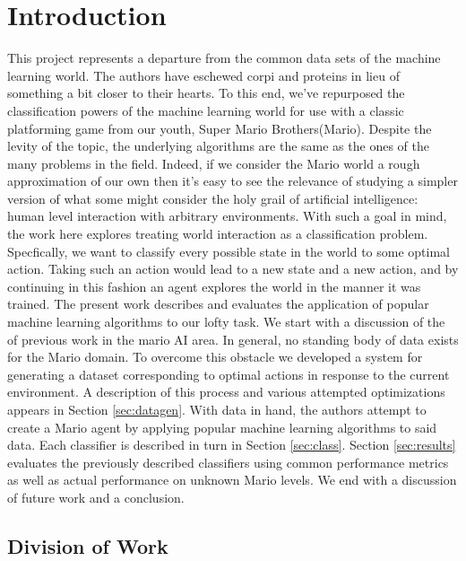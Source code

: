 \documentclass[]{article}   %
\begin{document}
\section{Introduction}     %
This project represents a departure from the common data sets of the machine learning world. The authors have eschewed corpi and proteins in lieu of something a bit closer to their hearts.  To this end, we've repurposed the classification powers of the machine learning world for use with a classic platforming game from our youth, Super Mario Brothers(Mario).  Despite the levity of the topic, the underlying algorithms are the same as the ones of the  many problems in the field.  Indeed, if we consider the Mario world a rough approximation of our own then it's easy to see the relevance of studying a simpler version of what some might consider the holy grail of artificial intelligence: human level interaction with arbitrary environments.
\newline\newline
With such a goal in mind, the work here explores treating world interaction as a classification problem.  Specfically, we want to classify every possible state in the world to some optimal action. Taking such an action would lead to a new state and a new action, and by continuing in this fashion an agent explores the world in the manner it was trained.
\newline\newline
The present work describes and evaluates the application of popular machine learning algorithms to our lofty task.  We start with a discussion of the of previous work in the mario AI area.  In general, no standing body of data exists for the Mario domain.  To overcome this obstacle we developed a system for generating a dataset corresponding to optimal actions in response to the current environment.  A description of this process and various attempted optimizations appears in Section \ref{sec:datagen}.  With data in hand, the authors attempt to create a Mario agent by applying popular machine learning algorithms to said data.  Each classifier is described in turn in Section \ref{sec:class}.  Section \ref{sec:results} evaluates the previously described classifiers using common performance metrics as well as actual performance on unknown Mario levels.  We end with a discussion of future work and a conclusion.

\subsection{Division of Work}
\end{document}
